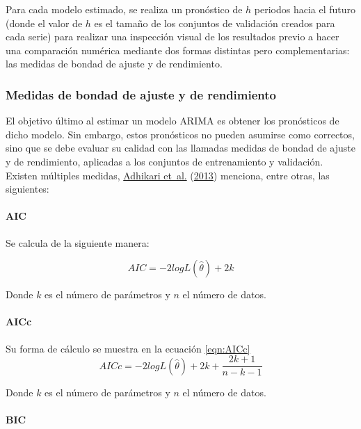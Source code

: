 \documentclass[
]{article}
\begin{document}
Para cada modelo estimado, se realiza un pronóstico de \(h\) periodos
hacia el futuro (donde el valor de \(h\) es el tamaño de los conjuntos
de validación creados para cada serie) para realizar una inspección
visual de los resultados previo a hacer una comparación numérica
mediante dos formas distintas pero complementarias: las medidas de
bondad de ajuste y de rendimiento.

\subsubsection{Medidas de bondad de ajuste y de rendimiento}

El objetivo último al estimar un modelo ARIMA es obtener los pronósticos
de dicho modelo. Sin embargo, estos pronósticos no pueden asumirse como
correctos, sino que se debe evaluar su calidad con las llamadas medidas
de bondad de ajuste y de rendimiento, aplicadas a los conjuntos de
entrenamiento y validación. Existen múltiples medidas,
\protect\hyperlink{ref-medidas}{Adhikari et~al.}
(\protect\hyperlink{ref-medidas}{2013}) menciona, entre otras, las
siguientes:

\paragraph{AIC}

Se calcula de la siguiente manera:

\begin{equation}
\label{eqn:AIC}
AIC=-2logL\left(\hat\theta\right)+2k
\end{equation}

Donde \(k\) es el número de parámetros y \(n\) el número de datos.

\paragraph{AICc}

Su forma de cálculo se muestra en la ecuación \ref{eqn:AICc}
\begin{equation}
\label{eqn:AICc}
AICc=-2logL\left(\hat\theta\right)+2k+\frac{2k+1}{n-k-1}
\end{equation}

Donde \(k\) es el número de parámetros y \(n\) el número de datos.

\paragraph{BIC}
\end{document}
